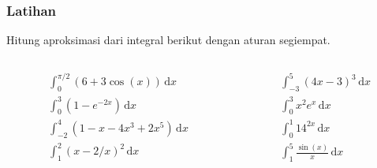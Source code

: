 \begin{frame}
\frametitle{Latihan}

Hitung aproksimasi dari integral berikut dengan aturan segiempat.

\begin{columns}

\begin{column}{0.5\textwidth}
\begin{align*}
& \int_{0}^{\pi/2} (6 + 3\cos(x)) \, \mathrm{d}x \\
& \int_{0}^{3} (1 - e^{-2x}) \, \mathrm{d}x \\
& \int_{-2}^{4} (1 - x - 4x^3 + 2x^5) \, \mathrm{d}x \\
& \int_{1}^{2} (x - 2/x)^2 \, \mathrm{d}x
\end{align*}      
\end{column}

\begin{column}{0.5\textwidth}
\begin{align*}
& \int_{-3}^{5} (4x - 3)^3 \, \mathrm{d}x \\
& \int_{0}^{3} x^2 e^x \, \mathrm{d}x \\
& \int_{0}^{1} 14^{2x} \, \mathrm{d}x \\
& \int_{1}^{5} \frac{\sin(x)}{x}\,\mathrm{d}x
\end{align*}
\end{column}

\end{columns}

\end{frame}